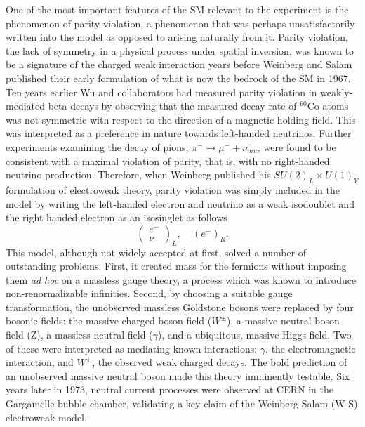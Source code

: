 One of the most important features of the SM relevant to the \Qs experiment is the phenomenon of parity violation, a phenomenon that was perhaps unsatisfactorily written into the model as opposed to arising naturally from it. Parity violation, the lack of symmetry in a physical process under spatial inversion, was known to be a signature of the charged weak interaction years before Weinberg and Salam published their early formulation of what is now the bedrock of the SM in 1967.  Ten years earlier Wu and collaborators had measured parity violation in weakly-mediated beta decays\cite{Wu} by observing that the measured decay rate of $^{60}$Co atoms was not symmetric with respect to the direction of a magnetic holding field. This was interpreted as a preference in nature towards left-handed neutrinos. Further experiments examining the decay of pions, $\pi^-\longrightarrow \mu^-+\bar{\nu_{mu}}$, were found to be consistent with a maximal violation of parity, that is, with no right-handed neutrino production\cite{Backenstoss}. Therefore, when Weinberg published his $SU(2)_L \times U(1)_Y$  formulation of electroweak theory, parity violation was simply included in the model by writing the left-handed electron and neutrino as a weak isodoublet and the right handed electron as an isosinglet\cite{Weinberg} as follows
\[
\left(\begin{array}{c}e^-\\\nu \end{array}\right)_L,~~~~~\left(e^-\right)_R.
\]
This model, although not widely accepted at first, solved a number of outstanding problems. First, it created mass for the fermions without imposing them {\it ad hoc} on a massless gauge theory, a process which was known to introduce non-renormalizable infinities. Second, by choosing a suitable gauge transformation, the unobserved massless Goldstone bosons were replaced by four bosonic fields: the massive charged boson field ($W^{\pm}$), a massive neutral boson field (Z), a massless neutral field ($\gamma$), and a ubiquitous, massive Higgs field. Two of these were interpreted as mediating known interactions: $\gamma$, the electromagnetic interaction, and $W^{\pm}$, the observed weak charged decays. The bold prediction of an unobserved massive neutral boson made this theory imminently testable. Six years later in 1973, neutral current processes were observed at CERN in the Gargamelle bubble chamber, validating a key claim of the Weinberg-Salam (W-S) electroweak model.  

